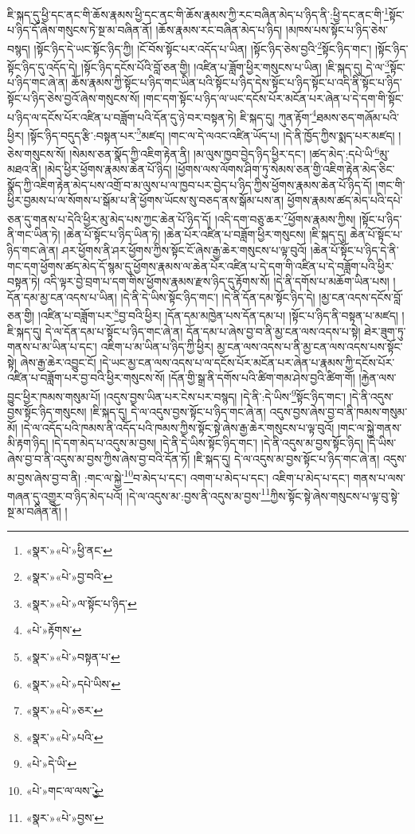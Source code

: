 ཇི་སྐད་དུ་ཕྱི་དང་ནང་གི་ཆོས་རྣམས་ཕྱི་དང་ནང་གི་ཆོས་རྣམས་ཀྱི་རང་བཞིན་མེད་པ་ཉིད་ནི་:ཕྱི་དང་ནང་གི་\footnote{«སྣར་»«པེ་»ཕྱི་ནང་}སྟོང་པ་ཉིད་དོ་ཞེས་གསུངས་ཏེ་སྔ་མ་བཞིན་ནོ། །ཆོས་རྣམས་རང་བཞིན་མེད་པ་ཉིད། །མཁས་པས་སྟོང་པ་ཉིད་ཅེས་བསྙད། །སྟོང་ཉིད་དེ་ཡང་སྟོང་ཉིད་ཀྱི། །ངོ་བོས་སྟོང་པར་འདོད་པ་ཡིན། །སྟོང་ཉིད་ཅེས་བྱའི་\footnote{«སྣར་»«པེ་»བྱ་བའི་}སྟོང་ཉིད་གང་། །སྟོང་ཉིད་སྟོང་ཉིད་དུ་འདོད་དེ། །སྟོང་ཉིད་དངོས་པོའི་བློ་ཅན་གྱི། །འཛིན་པ་ཟློག་ཕྱིར་གསུངས་པ་ཡིན། །ཇི་སྐད་དུ། དེ་ལ་\footnote{«སྣར་»«པེ་»ལ་སྟོང་པ་ཉིད་}སྟོང་པ་ཉིད་གང་ཞེ་ན། ཆོས་རྣམས་ཀྱི་སྟོང་པ་ཉིད་གང་ཡིན་པའི་སྟོང་པ་ཉིད་དེས་སྟོང་པ་ཉིད་སྟོང་པ་འདི་ནི་སྟོང་པ་ཉིད་སྟོང་པ་ཉིད་ཅེས་བྱའོ་ཞེས་གསུངས་སོ། །གང་དག་སྟོང་པ་ཉིད་ལ་ཡང་དངོས་པོར་མངོན་པར་ཞེན་པ་དེ་དག་གི་སྟོང་པ་ཉིད་ལ་དངོས་པོར་འཛིན་པ་བཟློག་པའི་དོན་དུ་ཉེ་བར་བསྟན་ཏེ། ཇི་སྐད་དུ། ཀུན་རྟོག་\footnote{«པེ་»རྟོགས་}ཐམས་ཅད་གཞོམ་པའི་ཕྱིར། །སྟོང་ཉིད་བདུད་རྩི་:བསྟན་པར་\footnote{«སྣར་»«པེ་»བསྟན་པ་}མཛད། །གང་ལ་དེ་ལའང་འཛིན་ཡོད་པ། །དེ་ནི་ཁྱོད་ཀྱིས་སྨད་པར་མཛད། །ཅེས་གསུངས་སོ། །སེམས་ཅན་སྣོད་ཀྱི་འཇིག་རྟེན་ནི། །མ་ལུས་ཁྱབ་བྱེད་ཉིད་ཕྱིར་དང་། །ཚད་མེད་:དཔེ་ཡི་\footnote{«སྣར་»«པེ་»དཔེ་ཡིས་}མུ་མཐའ་ནི། །མེད་ཕྱིར་ཕྱོགས་རྣམས་ཆེན་པོ་ཉིད། །ཕྱོགས་ལས་ལོགས་ཤིག་ཏུ་སེམས་ཅན་གྱི་འཇིག་རྟེན་མེད་ཅིང་སྣོད་ཀྱི་འཇིག་རྟེན་མེད་པས་འགྲོ་བ་མ་ལུས་པ་ལ་ཁྱབ་པར་བྱེད་པ་ཉིད་ཀྱིས་ཕྱོགས་རྣམས་ཆེན་པོ་ཉིད་དོ། །གང་གི་ཕྱིར་བྱམས་པ་ལ་སོགས་པ་སྒོམ་པ་ནི་ཕྱོགས་ཡོངས་སུ་བཅད་ནས་སྒོམ་པས་ན། ཕྱོགས་རྣམས་ཚད་མེད་པའི་དཔེ་ཅན་དུ་གནས་པ་དེའི་ཕྱིར་མུ་མེད་པས་ཀྱང་ཆེན་པོ་ཉིད་དོ། །འདི་དག་བཅུ་ཆར་\footnote{«སྣར་»«པེ་»ཅར་}ཕྱོགས་རྣམས་ཀྱིས། །སྟོང་པ་ཉིད་ནི་གང་ཡིན་ཏེ། །ཆེན་པོ་སྟོང་པ་ཉིད་ཡིན་ཏེ། །ཆེན་པོར་འཛིན་པ་བཟློག་ཕྱིར་གསུངས། །ཇི་སྐད་དུ། ཆེན་པོ་སྟོང་པ་ཉིད་གང་ཞེ་ན། ཤར་ཕྱོགས་ནི་ཤར་ཕྱོགས་ཀྱིས་སྟོང་ངོ་ཞེས་རྒྱ་ཆེར་གསུངས་པ་ལྟ་བུའོ། །ཆེན་པོ་སྟོང་པ་ཉིད་དེ་ནི་གང་དག་ཕྱོགས་ཚད་མེད་དོ་སྙམ་དུ་ཕྱོགས་རྣམས་ལ་ཆེན་པོར་འཛིན་པ་དེ་དག་གི་འཛིན་པ་དེ་བཟློག་པའི་ཕྱིར་བསྟན་ཏེ། འདི་ལྟར་བྱེ་བྲག་པ་དག་གིས་ཕྱོགས་རྣམས་རྫས་ཉིད་དུ་རྟོགས་སོ། །དེ་ནི་དགོས་པ་མཆོག་ཡིན་པས། །དོན་དམ་མྱ་ངན་འདས་པ་ཡིན། །དེ་ནི་དེ་ཡིས་སྟོང་ཉིད་གང་། །དེ་ནི་དོན་དམ་སྟོང་ཉིད་དེ། །མྱ་ངན་འདས་དངོས་བློ་ཅན་གྱི། །འཛིན་པ་བཟློག་པར་\footnote{«སྣར་»«པེ་»པའི་}བྱ་བའི་ཕྱིར། །དོན་དམ་མཁྱེན་པས་དོན་དམ་པ། །སྟོང་པ་ཉིད་ནི་བསྟན་པ་མཛད། །ཇི་སྐད་དུ། དེ་ལ་དོན་དམ་པ་སྟོང་པ་ཉིད་གང་ཞེ་ན། དོན་དམ་པ་ཞེས་བྱ་བ་ནི་མྱ་ངན་ལས་འདས་པ་སྟེ། ཐེར་ཟུག་ཏུ་གནས་པ་མ་ཡིན་པ་དང་། འཇིག་པ་མ་ཡིན་པ་ཉིད་ཀྱི་ཕྱིར། མྱ་ངན་ལས་འདས་པ་ནི་མྱ་ངན་ལས་འདས་པས་སྟོང་སྟེ། ཞེས་རྒྱ་ཆེར་འབྱུང་ངོ། །དེ་ཡང་མྱ་ངན་ལས་འདས་པ་ལ་དངོས་པོར་མངོན་པར་ཞེན་པ་རྣམས་ཀྱི་དངོས་པོར་འཛིན་པ་བཟློག་པར་བྱ་བའི་ཕྱིར་གསུངས་སོ། །དོན་གྱི་སྒྲ་ནི་དགོས་པའི་ཚིག་གམ་ཤེས་བྱའི་ཚིག་གོ། །རྐྱེན་ལས་བྱུང་ཕྱིར་ཁམས་གསུམ་པོ། །འདུས་བྱས་ཡིན་པར་ངེས་པར་བསྙད། །དེ་ནི་:དེ་ཡིས་\footnote{«པེ་»དེ་ཡི་}སྟོང་ཉིད་གང་། །དེ་ནི་འདུས་བྱས་སྟོང་ཉིད་གསུངས། །ཇི་སྐད་དུ། དེ་ལ་འདུས་བྱས་སྟོང་པ་ཉིད་གང་ཞེ་ན། འདུས་བྱས་ཞེས་བྱ་བ་ནི་ཁམས་གསུམ་མོ། །དེ་ལ་འདོད་པའི་ཁམས་ནི་འདོད་པའི་ཁམས་ཀྱིས་སྟོང་སྟེ་ཞེས་རྒྱ་ཆེར་གསུངས་པ་ལྟ་བུའོ། །གང་ལ་སྐྱེ་གནས་མི་རྟག་ཉིད། །དེ་དག་མེད་པ་འདུས་མ་བྱས། །དེ་ནི་དེ་ཡིས་སྟོང་ཉིད་གང་། །དེ་ནི་འདུས་མ་བྱས་སྟོང་ཉིད། །དེ་ཡིས་ཞེས་བྱ་བ་ནི་འདུས་མ་བྱས་ཀྱིས་ཞེས་བྱ་བའི་དོན་ཏོ། །ཇི་སྐད་དུ། དེ་ལ་འདུས་མ་བྱས་སྟོང་པ་ཉིད་གང་ཞེ་ན། འདུས་མ་བྱས་ཞེས་བྱ་བ་ནི། :གང་ལ་སྐྱེ་\footnote{«པེ་»གང་ལ་ལས་ྱེ་}བ་མེད་པ་དང་། འགག་པ་མེད་པ་དང་། འཇིག་པ་མེད་པ་དང་། གནས་པ་ལས་གཞན་དུ་འགྱུར་བ་ཉིད་མེད་པའོ། །དེ་ལ་འདུས་མ་:བྱས་ནི་འདུས་མ་བྱས་\footnote{«སྣར་»«པེ་»བྱས་}ཀྱིས་སྟོང་སྟེ་ཞེས་གསུངས་པ་ལྟ་བུ་སྟེ་སྔ་མ་བཞིན་ནོ། །
